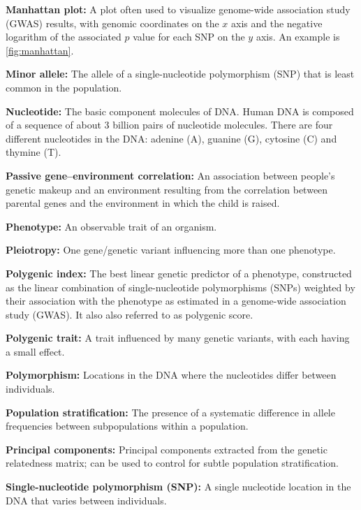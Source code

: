 \documentclass[12pt,a4paper]{article}
\begin{document}
\begin{bibunit}
\textbf{Manhattan plot:} A plot often used to visualize genome-wide association study (GWAS) results, with genomic coordinates on the $x$ axis and the negative logarithm of the associated $p$ value for each SNP on the $y$ axis. An example is \autoref{fig:manhattan}.

\textbf{Minor allele:} The allele of a single-nucleotide polymorphism (SNP) that is least common in the population.

\textbf{Nucleotide:} The basic component molecules of DNA. Human DNA is composed of a sequence of about 3 billion pairs of nucleotide molecules. There are four different nucleotides in the DNA: adenine (A), guanine (G), cytosine (C) and thymine (T).

\textbf{Passive gene--environment correlation:} An association between people's genetic makeup and an environment resulting from the correlation between parental genes and the environment in which the child is raised.

\textbf{Phenotype:} An observable trait of an organism.

\textbf{Pleiotropy:} One gene/genetic variant influencing more than one phenotype.

\textbf{Polygenic index:} The best linear genetic predictor of a phenotype, constructed as the linear combination of single-nucleotide polymorphisms (SNPs) weighted by their association with the phenotype as estimated in a genome-wide association study (GWAS). It also also referred to as polygenic score.

\textbf{Polygenic trait:} A trait influenced by many genetic variants, with each having a small effect.

\textbf{Polymorphism:} Locations in the DNA where the nucleotides differ between individuals.

\textbf{Population stratification:} The presence of a systematic difference in allele frequencies between subpopulations within a population.

\textbf{Principal components:} Principal components extracted from the genetic relatedness matrix; can be used to control for subtle population stratification.

\textbf{Single-nucleotide polymorphism (SNP):} A single nucleotide location in the DNA that varies between individuals.

\clearpage
\renewcommand{\thetable}{B.\arabic{table}}
\renewcommand{\thefigure}{B.\arabic{figure}}
\renewcommand{\theequation}{B.\arabic{equation}}
\setcounter{table}{0} 
\setcounter{figure}{0} 
\setcounter{equation}{0} 


\end{bibunit}
\end{document}
